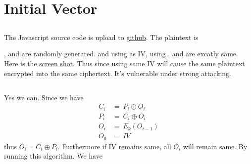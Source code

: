 \documentclass{article}
\begin{document}
\section{Initial Vector}
\subsection{}
The Javascript source code is upload to
\href{https://github.com/Luna1996/WUSTL/blob/master/571/L2/task41.js}{github}.
The plaintext is
\begin{center}
\end{center}
,  and  are randomly generated.  and  using  as IV,  using .  and  are excatly same. Here is the \href{https://i.loli.net/2018/09/25/5ba9b6889cf97.png}{screen shot}. Thus since using same IV will cause the same plaintext encrypted into the same ciphertext. It's vulnerable under strong attacking.
\subsection{}
Yes we can. Since we have$$
\begin{aligned}
	C_i & =\ P_i\oplus O_i \\
	P_i & =\ C_i\oplus O_i \\
	O_i & =\ E_k(O_{i-1})  \\
	O_0 & =\ IV
\end{aligned}
$$
thus $O_i = C_i\oplus P_i$. Furthermore if IV remains same, all $O_i$ will remain same. By running this algorithm. We have
\begin{center}
\end{center}
\end{document}

